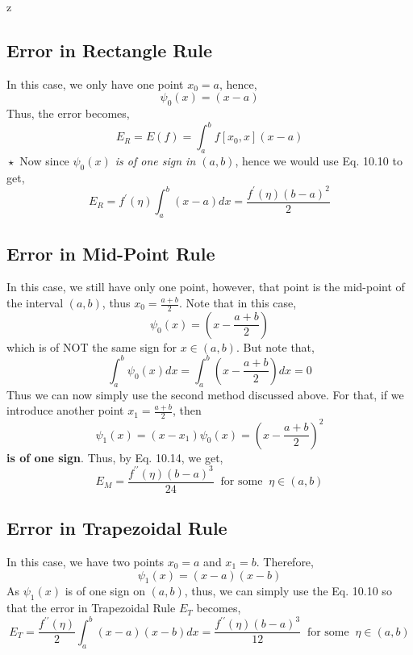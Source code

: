z\documentclass[a4paper,12pt,twoside]{book}
\newcommand{\nll}[0]{\newline\newline}
\newcommand{\tit}[1]{\textit{#1}}
\begin{document}
\subsection{Error in Rectangle Rule}
In this case, we only have one point $x_0 = a$, hence,
\[\psi_0(x) = (x-a)\]
Thus, the error becomes,
\[E_R = E(f) = \int_a^b f[x_0,x](x-a)\]
$\boxed{\star}$ Now since \tit{$\psi_0(x)$ is of one sign in $(a,b)$}, hence we would use Eq. 10.10 to get,
\begin{equation}
    E_R = f^\prime(\eta) \int_a^b (x-a)dx = \boxed{\frac{f^\prime(\eta)(b-a)^2}{2}}
\end{equation}
\subsection{Error in Mid-Point Rule}
In this case, we still have only one point, however, that point is the mid-point of the interval $(a,b)$, thus $x_0 = \frac{a+b}{2}$.
\nll
Note that in this case, 
\[\psi_0(x) = (x-\frac{a+b}{2})\]
which is of NOT the same sign for $x\in (a,b)$. But note that,
\[\int_a^b \psi_0(x) dx = \int_a^b \left( x-\frac{a+b}{2}\right)dx = 0\]
Thus we can now simply use the second method discussed above.
\nll
For that, if we introduce another point $x_1 = \frac{a+b}{2}$, then 
\[\psi_1(x) = (x-x_1)\psi_0(x) = (x-\frac{a+b}{2})^2\] 
\textbf{is of one sign}. Thus, by Eq. 10.14, we get,
\begin{equation}
    \boxed{E_M =\frac{f^{\prime\prime}(\eta)(b-a)^3}{24} \;\;\text{for some}\;\; \eta \in (a,b)}
\end{equation}
\subsection{Error in Trapezoidal Rule}
In this case, we have two points $x_0 = a$ and $x_1 = b$. Therefore, 
\[\psi_1(x) = (x-a)(x-b)\]
As $\psi_1(x)$ is of one sign on $(a,b)$, thus, we can simply use the Eq. 10.10 so that the error in Trapezoidal Rule $E_T$ becomes,
\begin{equation}
    \boxed{E_T = \frac{f^{\prime\prime}(\eta)}{2} \int_a^b (x-a)(x-b)dx = \frac{f^{\prime\prime}(\eta)(b-a)^3}{12} \;\;\text{for some}\;\; \eta \in (a,b)}
\end{equation}
\end{document}
